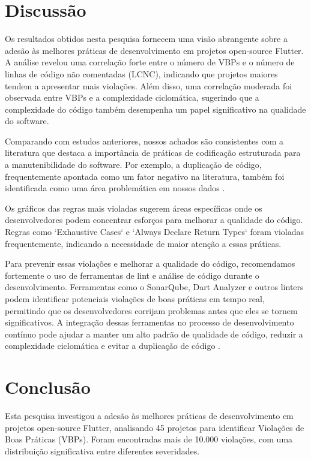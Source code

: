 \documentclass[12pt]{article}
\begin{document}
\section{Discussão}
Os resultados obtidos nesta pesquisa fornecem uma visão abrangente sobre a adesão às melhores práticas de desenvolvimento em projetos open-source Flutter. A análise revelou uma correlação forte entre o número de VBPs e o número de linhas de código não comentadas (LCNC), indicando que projetos maiores tendem a apresentar mais violações. Além disso, uma correlação moderada foi observada entre VBPs e a complexidade ciclomática, sugerindo que a complexidade do código também desempenha um papel significativo na qualidade do software.

Comparando com estudos anteriores, nossos achados são consistentes com a literatura que destaca a importância de práticas de codificação estruturada para a manutenibilidade do software. Por exemplo, a duplicação de código, frequentemente apontada como um fator negativo na literatura, também foi identificada como uma área problemática em nossos dados \cite{hunt1999pragmatic}.

Os gráficos das regras mais violadas sugerem áreas específicas onde os desenvolvedores podem concentrar esforços para melhorar a qualidade do código. Regras como `Exhaustive Cases` e `Always Declare Return Types` foram violadas frequentemente, indicando a necessidade de maior atenção a essas práticas.

Para prevenir essas violações e melhorar a qualidade do código, recomendamos fortemente o uso de ferramentas de lint e análise de código durante o desenvolvimento. Ferramentas como o SonarQube, Dart Analyzer e outros linters podem identificar potenciais violações de boas práticas em tempo real, permitindo que os desenvolvedores corrijam problemas antes que eles se tornem significativos. A integração dessas ferramentas no processo de desenvolvimento contínuo pode ajudar a manter um alto padrão de qualidade de código, reduzir a complexidade ciclomática e evitar a duplicação de código \cite{martin2011clean}.

\section{Conclusão}
Esta pesquisa investigou a adesão às melhores práticas de desenvolvimento em projetos open-source Flutter, analisando 45 projetos para identificar Violações de Boas Práticas (VBPs). Foram encontradas mais de 10.000 violações, com uma distribuição significativa entre diferentes severidades.
\end{document}
